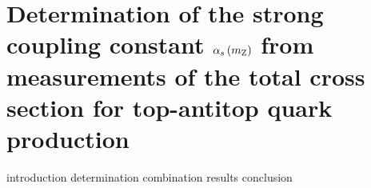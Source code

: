 \section{Determination of the strong coupling constant \texorpdfstring{$\alpha_s \left( m_\mathrm{Z} \right) $}{alpha_s(mZ)} from measurements of the total cross section for top-antitop quark production}

{introduction}
{determination}
{combination}
{results}
{conclusion}


